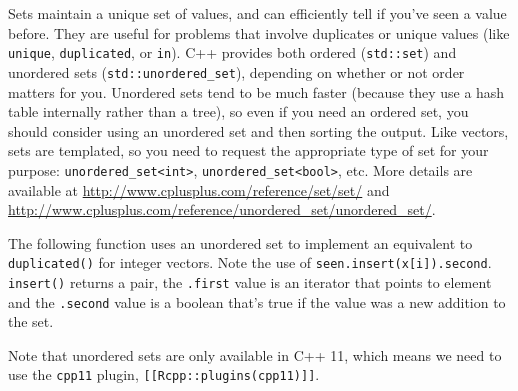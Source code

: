 Sets maintain a unique set of values, and can efficiently tell if you've
seen a value before. They are useful for problems that involve
duplicates or unique values (like \texttt{unique}, \texttt{duplicated},
or \texttt{in}). C++ provides both ordered (\texttt{std::set}) and
unordered sets (\texttt{std::unordered\_set}), depending on whether or
not order matters for you. Unordered sets tend to be much faster
(because they use a hash table internally rather than a tree), so even
if you need an ordered set, you should consider using an unordered set
and then sorting the output. Like vectors, sets are templated, so you
need to request the appropriate type of set for your purpose:
\texttt{unordered\_set\textless{}int\textgreater{}},
\texttt{unordered\_set\textless{}bool\textgreater{}}, etc. More details
are available at \url{http://www.cplusplus.com/reference/set/set/} and
\url{http://www.cplusplus.com/reference/unordered_set/unordered_set/}.

The following function uses an unordered set to implement an equivalent
to \texttt{duplicated()} for integer vectors. Note the use of
\texttt{seen.insert(x{[}i{]}).second}. \texttt{insert()} returns a pair,
the \texttt{.first} value is an iterator that points to element and the
\texttt{.second} value is a boolean that's true if the value was a new
addition to the set.

\begin{Shaded}
\begin{Highlighting}[]
 


  \NormalTok{ (}
\NormalTok{  \}}

\NormalTok{\}}
\end{Highlighting}
\end{Shaded}

Note that unordered sets are only available in C++ 11, which means we
need to use the \texttt{cpp11} plugin,
\texttt{{[}{[}Rcpp::plugins(cpp11){]}{]}}.


